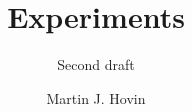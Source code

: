 \documentclass[a4paper,english]{report}
\author{Martin J. Hovin}
\begin{document}
\title{Experiments}
\subtitle{Second draft}

\maketitle


%
%

\end{document}
